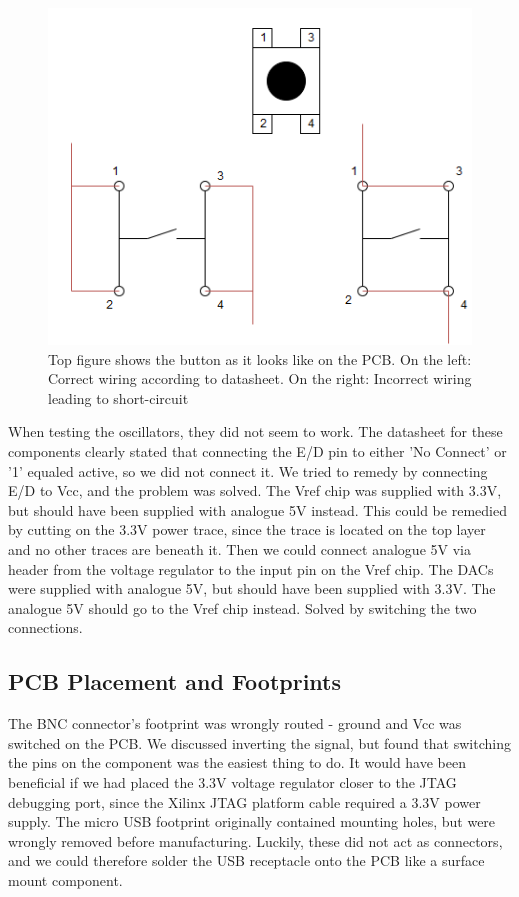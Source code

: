 \begin{figure}[h!]
\centering
\includegraphics[scale=0.5]{images/Button_Issue.png}
\caption{Top figure shows the button as it looks like on the PCB. On the left: Correct wiring according to datasheet. On the right: Incorrect wiring leading to short-circuit}
\label{fig:Button Issue}
\end{figure}

When testing the oscillators, they did not seem to work. The datasheet for these components clearly stated that connecting the E/D pin to either 'No Connect' or '1' equaled active, so we did not connect it. We tried to remedy by connecting E/D to Vcc, and the problem was solved.
\newline
\newline
The Vref chip was supplied with 3.3V, but should have been supplied with analogue 5V instead. This could be remedied by cutting on the 3.3V power trace, since the trace is located on the top layer and no other traces are beneath it. Then we could connect analogue 5V via header from the voltage regulator to the input pin on the Vref chip.
\newline
The DACs were supplied with analogue 5V, but should have been supplied with 3.3V. The analogue 5V should go to the Vref chip instead. Solved by switching the two connections.

\subsection{PCB Placement and Footprints}
The BNC connector's footprint was wrongly routed - ground and Vcc was switched on the PCB. We discussed inverting the signal, but found that switching the pins on the component was the easiest thing to do.
\newline
\newline
It would have been beneficial if we had placed the 3.3V voltage regulator closer to the JTAG debugging port, since the Xilinx JTAG platform cable required a 3.3V power supply.
\newline
\newline
The micro USB footprint originally contained mounting holes, but were wrongly removed before manufacturing. Luckily, these did not act as connectors, and we could therefore solder the USB receptacle onto the PCB like a surface mount component.

